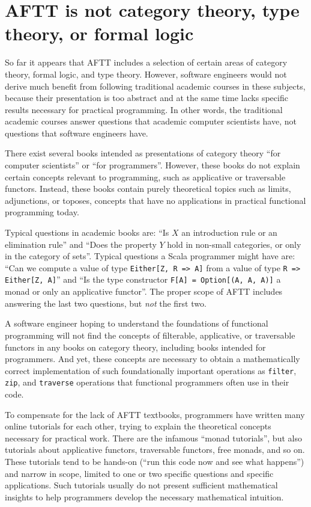 \section{AFTT is not category theory, type theory, or formal logic}

So far it appears that AFTT includes a selection of certain areas
of category theory, formal logic, and type theory. However, software
engineers would not derive much benefit from following traditional
academic courses in these subjects, because their presentation is
too abstract and at the same time lacks specific results necessary
for practical programming. In other words, the traditional academic
courses answer questions that academic computer scientists have, not
questions that software engineers have.

There exist several books intended as presentations of category theory
``for computer scientists'' or ``for programmers''. However, these
books do not explain certain concepts relevant to programming, such
as applicative or traversable functors. Instead, these books contain
purely theoretical topics such as limits, adjunctions, or toposes,
\textendash{} concepts that have no applications in practical functional
programming today.

Typical questions in academic books are: ``Is $X$ an introduction
rule or an elimination rule'' and ``Does the property $Y$ hold
in non-small categories, or only in the category of sets''. Typical
questions a Scala programmer might have are: ``Can we compute a value
of type \lstinline!Either[Z, R => A]! from a value of type \lstinline!R => Either[Z, A]!''
and ``Is the type constructor \lstinline!F[A] = Option[(A, A, A)]!
a monad or only an applicative functor''. The proper scope of AFTT
includes answering the last two questions, but \emph{not} the first
two.

A software engineer hoping to understand the foundations of functional
programming will not find the concepts of filterable, applicative,
or traversable functors in any books on category theory, including
books intended for programmers. And yet, these concepts are necessary
to obtain a mathematically correct implementation of such foundationally
important operations as \lstinline!filter!, \lstinline!zip!, and
\lstinline!traverse! \textendash{} operations that functional programmers
often use in their code.

To compensate for the lack of AFTT textbooks, programmers have written
many online tutorials for each other, trying to explain the theoretical
concepts necessary for practical work. There are the infamous ``monad
tutorials'', but also tutorials about applicative functors, traversable
functors, free monads, and so on. These tutorials tend to be hands-on
(``run this code now and see what happens'') and narrow in scope,
limited to one or two specific questions and specific applications.
Such tutorials usually do not present sufficient mathematical insights
to help programmers develop the necessary mathematical intuition.

